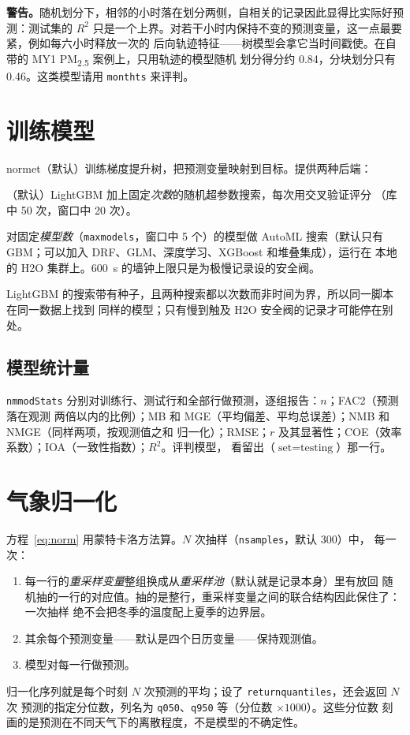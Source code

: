 \documentclass[11pt]{ctexrep}
\newcommand{\nosep}{\setlength{\itemsep}{0pt}\setlength{\parskip}{0pt}\setlength{\topsep}{2pt}}
\newcommand{\nm}{\textsf{normet}}
\newcommand{\codeunderscore}{\textunderscore\allowbreak}
\newcommand{\code}[1]{\texttt{\let\_\codeunderscore #1}}
\newcommand{\PMtwo}{PM\textsubscript{2.5}}
\newcommand{\caution}[1]{\par\noindent\colorbox{warn!15}{\parbox{0.97\linewidth}{\small\textbf{警告。}#1}}\par}
\begin{document}
\caution{随机划分下，相邻的小时落在划分两侧，自相关的记录因此显得比实际好预测：测试集的
$R^2$ 只是一个上界。对若干小时内保持不变的预测变量，这一点最要紧，例如每六小时释放一次的
后向轨迹特征——树模型会拿它当时间戳使。在自带的 MY1 \PMtwo{} 案例上，只用轨迹的模型随机
划分得分约 0.84，分块划分只有 0.46。这类模型请用 \code{month\_ts} 来评判。}

\section{训练模型}\label{sec:train}
\nm{}（默认）训练梯度提升树，把预测变量映射到目标。提供两种后端：
\begin{description}\nosep
  \item[LightGBM]（默认）LightGBM 加上固定\emph{次数}的随机超参数搜索，每次用交叉验证评分
        （库中 50 次，窗口中 20 次）。
  \item[H2O AutoML] 对固定\emph{模型数}（\code{max\_models}，窗口中 5 个）的模型做 AutoML
        搜索（默认只有 GBM；可以加入 DRF、GLM、深度学习、XGBoost 和堆叠集成），运行在
        本地的 H2O 集群上。600~s 的墙钟上限只是为极慢记录设的安全阀。
\end{description}
LightGBM 的搜索带有种子，且两种搜索都以次数而非时间为界，所以同一脚本在同一数据上找到
同样的模型；只有慢到触及 H2O 安全阀的记录才可能停在别处。

\subsection{模型统计量}\label{sec:modstats}
\code{nm\_modStats} 分别对训练行、测试行和全部行做预测，逐组报告：$n$；FAC2（预测落在观测
两倍以内的比例）；MB 和 MGE（平均偏差、平均总误差）；NMB 和 NMGE（同样两项，按观测值之和
归一化）；RMSE；$r$ 及其显著性；COE（效率系数）；IOA（一致性指数）；$R^2$。评判模型，
看留出（$\text{set} = \text{testing}$）那一行。

\section{气象归一化}\label{sec:normalise}
方程~\eqref{eq:norm} 用蒙特卡洛方法算。$N$ 次抽样（\code{n\_samples}，默认 300）中，
每一次：
\begin{enumerate}\nosep
  \item 每一行的\emph{重采样变量}整组换成从\emph{重采样池}（默认就是记录本身）里有放回
        随机抽的一行的对应值。抽的是整行，重采样变量之间的联合结构因此保住了：一次抽样
        绝不会把冬季的温度配上夏季的边界层。
  \item 其余每个预测变量——默认是四个日历变量——保持观测值。
  \item 模型对每一行做预测。
\end{enumerate}
归一化序列就是每个时刻 $N$ 次预测的平均；设了 \code{return\_quantiles}，还会返回 $N$ 次
预测的指定分位数，列名为 \code{q050}、\code{q950} 等（分位数 $\times 1000$）。这些分位数
刻画的是预测在不同天气下的离散程度，不是模型的不确定性。
\end{document}
